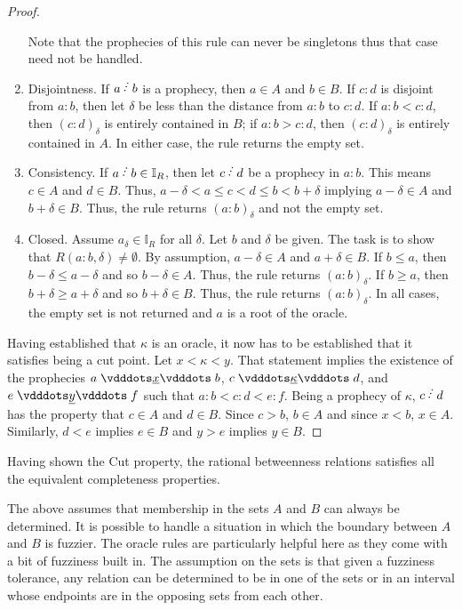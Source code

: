 \documentclass[12pt]{article}
\begin{document}
\begin{proof}
\begin{enumerate}
    Note that the prophecies of this rule can never be singletons thus that case need not be handled. 
    \item Disjointness. If $a\lte b$ is a prophecy, then $a \in A$ and $b \in B$. If $c:d$ is disjoint from $a:b$, then let $\delta$ be less than the distance from $a:b$ to $c:d$. If $a:b < c:d$, then $(c:d)_\delta$ is entirely contained in $B$; if $a:b > c:d$, then $(c:d)_\delta$ is entirely contained in $A$. In either case, the rule returns the empty set. 
    \item Consistency. If $a \lte b \in \mathbb{I}_R$, then let $c\lte d$ be a prophecy in $a:b$. This means $c \in A$ and $d \in B$. Thus, $a-\delta < a \leq c < d \leq b < b + \delta$ implying $a-\delta \in A$ and $b+\delta \in B$. Thus, the rule returns $(a:b)_\delta$ and not the empty set. 
    \item Closed. Assume $a_\delta \in \mathbb{I}_R$ for all $\delta$. Let $b$ and $\delta$ be given. The task is to show that $R(a:b, \delta) \neq \emptyset$. By assumption, $a-\delta \in A$ and $a+\delta \in B$. If $b \leq a$, then $b-\delta \leq a- \delta$ and so $b-\delta \in A$. Thus, the rule returns $(a:b)_\delta$. If $b \geq a$, then $b+\delta \geq  a+\delta$ and so $b+\delta \in B$. Thus, the rule returns $(a:b)_\delta$. In all cases, the empty set is not returned and $a$ is a root of the oracle. 
\end{enumerate}

Having established that $\kappa$ is an oracle, it now has to be established that it satisfies being a cut point. Let $x < \kappa < y$. That statement implies the existence of the prophecies $a \xrel b$, $c \xrel[\kappa] d$, and $ e \xrel[y] f$ such that $a:b < c:d < e:f$. Being a prophecy of $\kappa$, $c \lte d$ has the property that $c \in A$ and $d \in B$. Since $c > b$, $b \in A$ and since $x < b$, $x \in A$. Similarly, $d < e$ implies $e \in B$ and $y > e$ implies $y \in B$.

\end{proof}

Having shown the Cut property, the rational betweenness relations satisfies all the equivalent completeness properties. 

The above assumes that membership in the sets $A$ and $B$ can always be determined. It is possible to handle a situation in which the boundary between $A$ and $B$ is fuzzier. The oracle rules are particularly helpful here as they come with a bit of fuzziness built in. The assumption on the sets is that given a fuzziness tolerance, any relation can be determined to be in one of the sets or in an interval whose endpoints are in the opposing sets from each other. 
\end{document}
